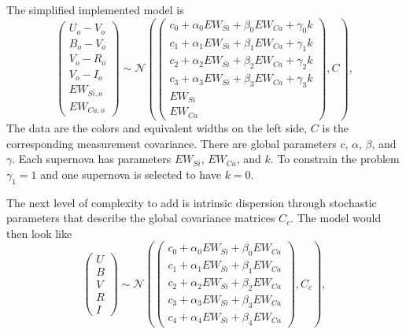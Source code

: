 \documentclass[11pt, oneside]{article}   	%
\begin{document}
The simplified implemented model is
\begin{equation}
\left(
\begin{matrix}
U_o-V_o\\B_o-V_o\\V_o-R_o\\V_o-I_o\\EW_{Si, o}\\ EW_{Ca, o}
\end{matrix}
\right) \sim \mathcal{N}
\left(
\left(
\begin{matrix}
c_0+\alpha_0 EW_{Si} + \beta_0 EW_{Ca} +\gamma_0 k  \\
c_1+\alpha_1 EW_{Si} + \beta_1 EW_{Ca}  +\gamma_1 k  \\
c_2+\alpha_2 EW_{Si} + \beta_2 EW_{Ca} +\gamma_2 k\\
c_3+\alpha_3 EW_{Si} + \beta_3 EW_{Ca} +\gamma_3 k\\
EW_{Si}\\ EW_{Ca}
\end{matrix}
\right)
,C
\right),
\end{equation}
The data are the colors and equivalent widths on the left side, $C$ is the corresponding measurement
covariance.  There are global parameters $c$, $\alpha$, $\beta$, and $\gamma$.  Each
supernova has parameters $EW_{Si}$, $EW_{Ca}$, and $k$.  To constrain the problem $\gamma_1=1$ and one supernova is selected to have
$k=0$.

The next level of complexity to add is intrinsic dispersion through stochastic parameters that describe the global  covariance matrices
$C_{c}$.  The model would then look like
\begin{equation}
\left(
\begin{matrix}
U\\B\\V\\R\\I
\end{matrix}
\right) \sim \mathcal{N}
\left(
\left(
\begin{matrix}
c_0+\alpha_0 EW_{Si} + \beta_0 EW_{Ca} \\
c_1+\alpha_1 EW_{Si} + \beta_1 EW_{Ca}  \\
c_2+\alpha_2 EW_{Si} + \beta_2 EW_{Ca} \\
c_3+\alpha_3 EW_{Si} + \beta_3 EW_{Ca} \\
c_4+\alpha_4 EW_{Si} + \beta_4 EW_{Ca}
\end{matrix}
\right)
,C_{c}
\right),
\end{equation}
\end{document}

